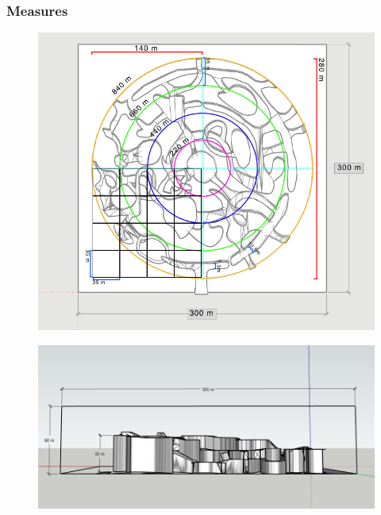 \subsubsection{Measures}
\begin{figure}[H]
	\centering
	\includegraphics[width=14cm]{images/map/map_measures.png}
\end{figure}

\begin{figure}[H]
	\centering
	\includegraphics[width=14cm]{images/map/3D_map_half.png}
\end{figure}
\newpage

